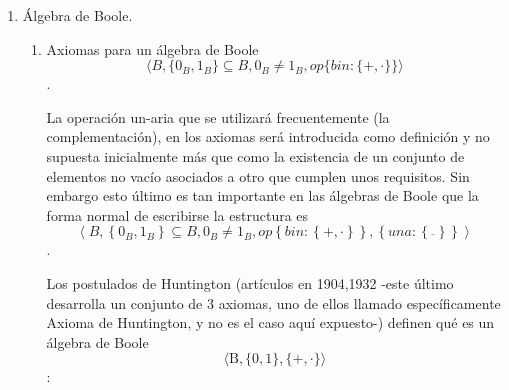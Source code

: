 \begin{enumerate}
\begin{enumerate}
    que para el cuantificador univer\-sal (que evitaremos en lo posible)
    no pondremos ningún símbolo de forma que, cuando aparezca una
    variable o conjunto o constante sin haber sido cuantificada
    supondremos que se aplica el cuantificador universal a la variable o
    constante situándolo dentro de \[B\]. Si el cuantificador universal
    debiera aplicarse a una variable sobre otro conjunto subconjunto de
    \[B\] se omitirá el cuantificador universal pero se precederá la
    sentencia con una indicación sobre la pertenencia del elemento. Para
    cualquier elemento en el que no aparezca su pertenencia es porque
    pertenece al universal \[B\]. Al igual, cuando una variable que
    asuma un valor que sea un conjunto este será parte de \[\wp{(B)}\],
    no aparecerá de forma explícita. Para las variable conjunto se
    repite todo lo anterior con la diferencia de cambiar \[B\] por
    \[\wp{(B)}\]. De otro lado podemos considerar la clase propia de las
    álgebras de Boole.
  \end{enumerate}
\item
  Álgebra de Boole.

  \begin{enumerate}
  \def\labelenumii{\arabic{enumii}.}
  \item
    Axiomas para un álgebra de Boole
    \[\langle{B,{{\{{0_{B},1_{B}}\}} \subseteq B},{0_{B} \neq 1_{B}},{\mathit{op}{\{{\mathit{bin}:{\{{+ , \cdot}\}}}\}}}}\rangle\].

    La operación un-aria que se utilizará frecuentemente (la
    complementación), en los axio\-mas será introducida como definición
    y no supuesta inicialmente más que como la exis\-tencia de un
    conjunto de elementos no vacío asociados a otro que cumplen unos
    requisi\-tos. Sin embargo esto último es tan importante en las
    álgebras de Boole que la forma normal de escribirse la estructura es
    \[\left\langle {B,{\left\{ {0_{B},1_{B}} \right\} \subseteq B},{0_{B} \neq 1_{B}},{\mathit{op}\left\{ {\mathit{bin}:\left\{ {+ , \cdot} \right\}} \right\},\left\{ {\mathit{una}:\left\{ \overline{} \right\}} \right\}}} \right\rangle\].

    Los postulados de Huntington (artículos en 1904,1932 -este último
    desarrolla un con\-junto de 3 axiomas, uno de ellos llamado
    específicamente Axioma de Huntington, y no es el caso aquí
    expuesto-) definen qué es un álgebra de Boole
    \[\langle{\mathtt{\mathrm{B}},{\{{\mathtt{\mathrm{0}},\mathtt{\mathrm{1}}}\}},{\{{+ , \cdot}\}}}\rangle\]:


\end{enumerate}
\end{enumerate}
